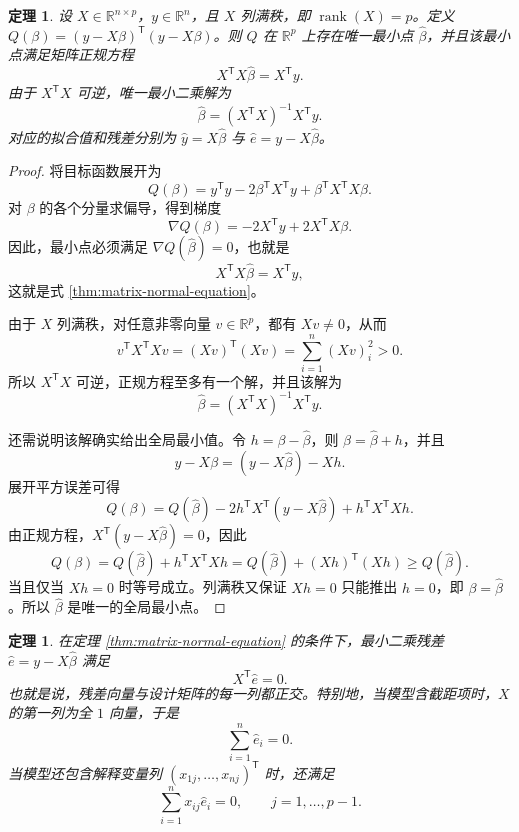 \documentclass[UTF8,fontset=fandol,11pt]{ctexart}
\newtheorem{theorem}[definition]{定理}
\begin{document}
\begin{theorem}
\label{thm:unique-least-squares-solution}设 $X\in\mathbb{R}^{n\times p}$，$y\in\mathbb{R}^{n}$，且 $X$ 列满秩，即 $\operatorname{rank}(X)=p$。定义 $Q(\beta)=(y-X\beta)^{\mathsf T}(y-X\beta)$。则 $Q$ 在 $\mathbb{R}^{p}$ 上存在唯一最小点 $\hat\beta$，并且该最小点满足矩阵正规方程
\begin{equation}
X^{\mathsf T}X\hat\beta=X^{\mathsf T}y.
\label{thm:matrix-normal-equation}
\end{equation}
由于 $X^{\mathsf T}X$ 可逆，唯一最小二乘解为
\[
\hat\beta=(X^{\mathsf T}X)^{-1}X^{\mathsf T}y.
\]
对应的拟合值和残差分别为 $\hat y=X\hat\beta$ 与 $\hat e=y-X\hat\beta$。
\end{theorem}
\begin{proof}
将目标函数展开为
\[
Q(\beta)=y^{\mathsf T}y-2\beta^{\mathsf T}X^{\mathsf T}y+\beta^{\mathsf T}X^{\mathsf T}X\beta.
\]
对 $\beta$ 的各个分量求偏导，得到梯度
\[
\nabla Q(\beta)=-2X^{\mathsf T}y+2X^{\mathsf T}X\beta.
\]
因此，最小点必须满足 $\nabla Q(\hat\beta)=0$，也就是
\[
X^{\mathsf T}X\hat\beta=X^{\mathsf T}y,
\]
这就是式 \eqref{thm:matrix-normal-equation}。

由于 $X$ 列满秩，对任意非零向量 $v\in\mathbb{R}^{p}$，都有 $Xv\neq 0$，从而
\[
v^{\mathsf T}X^{\mathsf T}Xv=(Xv)^{\mathsf T}(Xv)=\sum_{i=1}^{n}(Xv)_i^2>0.
\]
所以 $X^{\mathsf T}X$ 可逆，正规方程至多有一个解，并且该解为
\[
\hat\beta=(X^{\mathsf T}X)^{-1}X^{\mathsf T}y.
\]

还需说明该解确实给出全局最小值。令 $h=\beta-\hat\beta$，则 $\beta=\hat\beta+h$，并且
\[
y-X\beta=(y-X\hat\beta)-Xh.
\]
展开平方误差可得
\[
Q(\beta)=Q(\hat\beta)-2h^{\mathsf T}X^{\mathsf T}(y-X\hat\beta)+h^{\mathsf T}X^{\mathsf T}Xh.
\]
由正规方程，$X^{\mathsf T}(y-X\hat\beta)=0$，因此
\[
Q(\beta)=Q(\hat\beta)+h^{\mathsf T}X^{\mathsf T}Xh
=Q(\hat\beta)+(Xh)^{\mathsf T}(Xh)\geq Q(\hat\beta).
\]
当且仅当 $Xh=0$ 时等号成立。列满秩又保证 $Xh=0$ 只能推出 $h=0$，即 $\beta=\hat\beta$。所以 $\hat\beta$ 是唯一的全局最小点。
\end{proof}
\begin{theorem}
在定理 \eqref{thm:matrix-normal-equation} 的条件下，最小二乘残差 $\hat e=y-X\hat\beta$ 满足
\[
X^{\mathsf T}\hat e=0.
\]
也就是说，残差向量与设计矩阵的每一列都正交。特别地，当模型含截距项时，$X$ 的第一列为全 $1$ 向量，于是
\[
\sum_{i=1}^{n}\hat e_i=0.
\]
当模型还包含解释变量列 $(x_{1j},\ldots,x_{nj})^{\mathsf T}$ 时，还满足
\[
\sum_{i=1}^{n}x_{ij}\hat e_i=0,
\qquad j=1,\ldots,p-1.
\]
\end{theorem}
\end{document}
